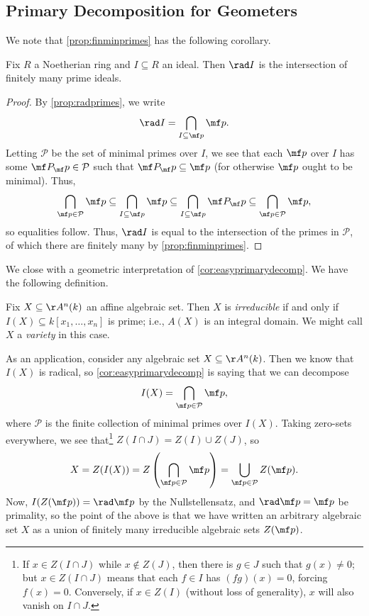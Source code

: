 \documentclass[../notes.tex]{subfiles}
\begin{document}
\subsection{Primary Decomposition for Geometers}
We note that \autoref{prop:finminprimes} has the following corollary.
\begin{corollary} \label{cor:easyprimarydecomp}
	Fix $R$ a Noetherian ring and $I\subseteq R$ an ideal. Then $\rad I$ is the intersection of finitely many prime ideals.
\end{corollary}
\begin{proof}
	By \autoref{prop:radprimes}, we write
	\[\rad I=\bigcap_{I\subseteq\mf p}\mf p.\]
	Letting $\mathcal P$ be the set of minimal primes over $I$, we see that each $\mf p$ over $I$ has some $\mf P_\mf p\in\mathcal P$ such that $\mf P_\mf p\subseteq\mf p$ (for otherwise $\mf p$ ought to be minimal). Thus,
	\[\bigcap_{\mf p\in\mathcal P}\mf p\subseteq\bigcap_{I\subseteq\mf p}\mf p\subseteq\bigcap_{I\subseteq\mf p}\mf P_\mf p\subseteq\bigcap_{\mf p\in\mathcal P}\mf p,\]
	so equalities follow. Thus, $\rad I$ is equal to the intersection of the primes in $\mathcal P$, of which there are finitely many by \autoref{prop:finminprimes}.
\end{proof}
We close with a geometric interpretation of \autoref{cor:easyprimarydecomp}. We have the following definition.
\begin{defi}[Irreducible]
	Fix $X\subseteq\AA^n(k)$ an affine algebraic set. Then $X$ is \textit{irreducible} if and only if $I(X)\subseteq k[x_1,\ldots,x_n]$ is prime; i.e., $A(X)$ is an integral domain. We might call $X$ a \textit{variety} in this case.
\end{defi}
As an application, consider any algebraic set $X\subseteq\AA^n(k)$. Then we know that $I(X)$ is radical, so \autoref{cor:easyprimarydecomp} is saying that we can decompose
\[I(X)=\bigcap_{\mf p\in\mathcal P}\mf p,\]
where $\mathcal P$ is the finite collection of minimal primes over $I(X)$. Taking zero-sets everywhere, we see that\footnote{If $x\in Z(I\cap J)$ while $x\notin Z(J)$, then there is $g\in J$ such that $g(x)\ne0$; but $x\in Z(I\cap J)$ means that each $f\in I$ has $(fg)(x)=0$, forcing $f(x)=0$. Conversely, if $x\in Z(I)$ (without loss of generality), $x$ will also vanish on $I\cap J$.} $Z(I\cap J)=Z(I)\cup Z(J)$, so
\[X=Z(I(X))=Z\left(\bigcap_{\mf p\in\mathcal P}\mf p\right)=\bigcup_{\mf p\in\mathcal P}Z(\mf p).\]
Now, $I(Z(\mf p))=\rad\mf p$ by the Nullstellensatz, and $\rad\mf p=\mf p$ be primality, so the point of the above is that we have written an arbitrary algebraic set $X$ as a union of finitely many irreducible algebraic sets $Z(\mf p)$.
\end{document}
